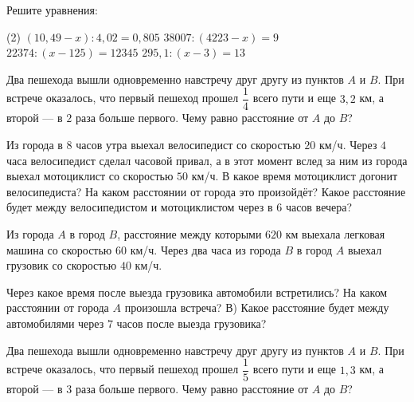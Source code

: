\begin{homework}[number=2]
	\begin{listofex}
		\item Решите уравнения: %
		\begin{tasks}(2)
			\task \( (10,49-x):4,02=0,805 \)
			\task \( 38007:(4223-x)=9 \)
			\task \( 22374:(x-125)=12345 \)
			\task \( 295,1:(x-3)=13 \)
		\end{tasks}
		\item Два пешехода вышли одновременно навстречу друг другу из пунктов \(A\) и \(B\). При встрече оказалось, что первый пешеход прошел \(\dfrac{ 1 }{ 4 }\) всего пути и еще \(3,2\) км, а второй --- в \(2\) раза больше первого. Чему равно расстояние от \(A\) до \(B\)?
		\item Из города в \(8\) часов утра выехал велосипедист со скоростью \(20\) км/ч. Через \(4\) часа велосипедист сделал часовой привал, а в этот момент вслед за ним из города выехал мотоциклист со скоростью \(50\) км/ч. В какое время мотоциклист догонит велосипедиста? На каком расстоянии от города это произойдёт? Какое расстояние будет между велосипедистом и мотоциклистом через в \(6\) часов вечера?
		\item Из города \(A\) в город \(B\), расстояние между которыми \(620\) км выехала легковая машина со скоростью \(60\) км/ч. Через два часа из города \(B\) в город \(A\) выехал грузовик со скоростью \(40\) км/ч.
		\begin{tasks}
			\task Через какое время после выезда грузовика автомобили встретились? 
			\task На каком расстоянии от города \(A\) произошла встреча? В) Какое расстояние будет между автомобилями через \(7\) часов после выезда грузовика?
		\end{tasks}
	\end{listofex}
\end{homework}

\begin{class}[number=5]
	\begin{listofex}
		\item Два пешехода вышли одновременно навстречу друг другу из пунктов \(A\) и \(B\). При встрече оказалось, что первый пешеход прошел \(\dfrac{ 1 }{ 5 }\) всего пути и еще \(1,3\) км, а второй --- в \(3\) раза больше первого. Чему равно расстояние от \(A\) до \(B\)?
	\end{listofex}
\end{class}

